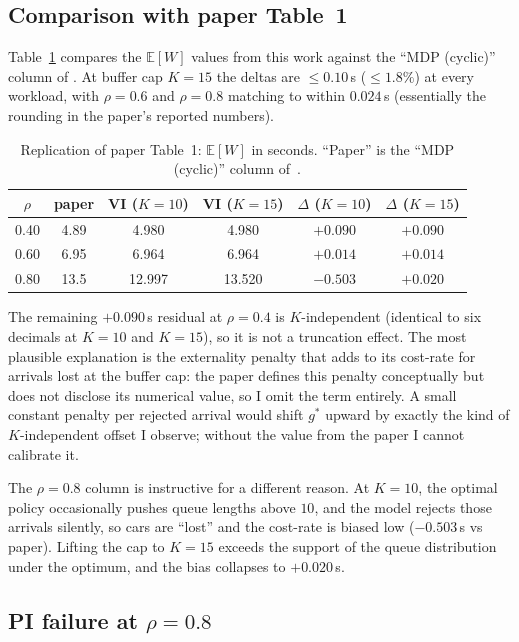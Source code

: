 \documentclass[11pt,a4paper]{article}
\newcommand{\E}{\mathbb{E}}
\begin{document}
\subsection{Comparison with paper Table~1}

Table~\ref{tab:paper} compares the $\E[W]$ values from this work
against the ``MDP (cyclic)'' column of \cite[Table~1]{haijema2008}.
At buffer cap $K = 15$ the deltas are
$\le 0.10$\,s ($\le 1.8\%$) at every workload, with $\rho = 0.6$ and
$\rho = 0.8$ matching to within $0.024$\,s (essentially the rounding
in the paper's reported numbers).

\begin{table}[h]
\centering
\caption{Replication of paper Table~1: $\E[W]$ in seconds. ``Paper''
is the ``MDP (cyclic)'' column of~\cite{haijema2008}.}
\label{tab:paper}
\begin{tabular}{cccccc}
\toprule
$\rho$ & paper & VI ($K = 10$) & VI ($K = 15$) &
$\Delta$ ($K = 10$) & $\Delta$ ($K = 15$) \\
\midrule
0.40 & 4.89  & 4.980  & 4.980  & $+0.090$ & $+0.090$ \\
0.60 & 6.95  & 6.964  & 6.964  & $+0.014$ & $+0.014$ \\
0.80 & 13.5  & 12.997 & 13.520 & $-0.503$ & $+0.020$ \\
\bottomrule
\end{tabular}
\end{table}

The remaining $+0.090$\,s residual at $\rho = 0.4$ is
$K$-independent (identical to six decimals at $K = 10$ and
$K = 15$), so it is not a truncation effect. The most plausible
explanation is the externality penalty that \cite[\S 3.5]{haijema2008}
adds to its cost-rate for arrivals lost at the buffer cap: the paper
defines this penalty conceptually but does not disclose its numerical
value, so I omit the term entirely. A small constant penalty per
rejected arrival would shift $g^*$ upward by exactly the kind of
$K$-independent offset I observe; without the value from the paper I
cannot calibrate it.

The $\rho = 0.8$ column is instructive for a different reason. At
$K = 10$, the optimal policy occasionally pushes queue lengths above
$10$, and the model rejects those arrivals silently, so cars are
``lost'' and the cost-rate is biased low ($-0.503$\,s vs paper).
Lifting the cap to $K = 15$ exceeds the support of the queue
distribution under the optimum, and the bias collapses to
$+0.020$\,s.

\subsection{PI failure at $\rho = 0.8$}
\label{ssec:pi-fail}
\end{document}

